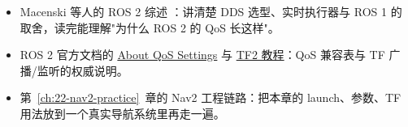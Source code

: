 \begin{reading}

\begin{itemize}
  \item Macenski 等人的 ROS 2 综述 \cite{macenski2022ros2}：讲清楚 DDS 选型、实时执行器与 ROS 1 的取舍，读完能理解"为什么 ROS 2 的 QoS 长这样"。
  \item ROS 2 官方文档的 \href{https://docs.ros.org/en/humble/Concepts/About-Quality-of-Service-Settings.html}{About QoS Settings} 与 \href{https://docs.ros.org/en/humble/Tutorials/Intermediate/Tf2/Tf2-Main.html}{TF2 教程}：QoS 兼容表与 TF 广播/监听的权威说明。
  \item 第~\ref{ch:22-nav2-practice}~章的 Nav2 工程链路：把本章的 launch、参数、TF 用法放到一个真实导航系统里再走一遍。
\end{itemize}


\end{reading}
